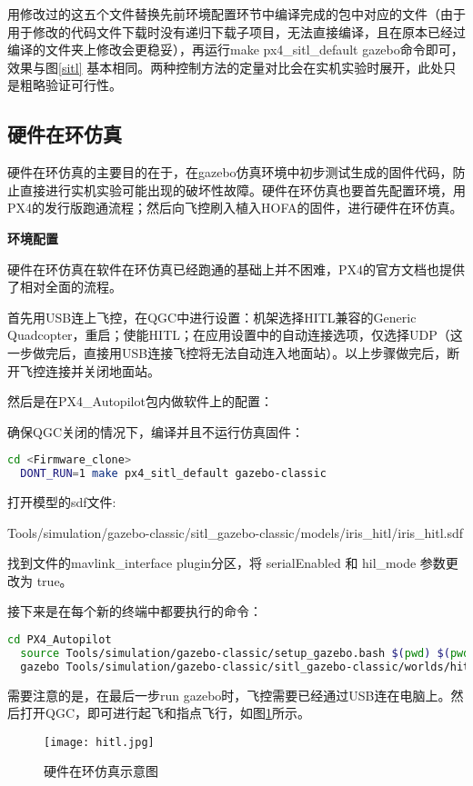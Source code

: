 用修改过的这五个文件替换先前环境配置环节中编译完成的包中对应的文件（由于用于修改的代码文件下载时没有递归下载子项目，无法直接编译，且在原本已经过编译的文件夹上修改会更稳妥），再运行make px4\_sitl\_default gazebo命令即可，效果与图\ref{sitl} 基本相同。两种控制方法的定量对比会在实机实验时展开，此处只是粗略验证可行性。

\subsection{硬件在环仿真}
硬件在环仿真的主要目的在于，在gazebo仿真环境中初步测试生成的固件代码，防止直接进行实机实验可能出现的破坏性故障。硬件在环仿真也要首先配置环境，用PX4的发行版跑通流程；然后向飞控刷入植入HOFA的固件，进行硬件在环仿真。

\textbf{环境配置}

硬件在环仿真在软件在环仿真已经跑通的基础上并不困难，PX4的官方文档也提供了相对全面的流程\cite{px4hitl}。

首先用USB连上飞控，在QGC中进行设置：机架选择HITL兼容的Generic Quadcopter，重启；使能HITL；在应用设置中的自动连接选项，仅选择UDP（这一步做完后，直接用USB连接飞控将无法自动连入地面站）。以上步骤做完后，断开飞控连接并关闭地面站。

然后是在PX4\_Autopilot包内做软件上的配置\cite{px4hitl}：

确保QGC关闭的情况下，编译并且不运行仿真固件：
\begin{lstlisting}[language=Bash, basicstyle=\footnotesize, linewidth=\linewidth, breaklines=true]
  cd <Firmware_clone>
  DONT_RUN=1 make px4_sitl_default gazebo-classic
\end{lstlisting}

打开模型的sdf文件:

Tools/simulation/gazebo-classic/sitl\_gazebo-classic/models/iris\_hitl/iris\_hitl.sdf

找到文件的mavlink\_interface plugin分区，将 serialEnabled 和 hil\_mode 参数更改为 true。

接下来是在每个新的终端中都要执行的命令：

\begin{lstlisting}[language=Bash, basicstyle=\footnotesize, linewidth=\linewidth, breaklines=true]
  cd PX4_Autopilot
  source Tools/simulation/gazebo-classic/setup_gazebo.bash $(pwd) $(pwd)/build/px4_sitl_default
  gazebo Tools/simulation/gazebo-classic/sitl_gazebo-classic/worlds/hitl_iris.world
\end{lstlisting}


需要注意的是，在最后一步run gazebo时，飞控需要已经通过USB连在电脑上。然后打开QGC，即可进行起飞和指点飞行，如图\ref{hitl}所示。
\begin{figure}[!h]
  \centering
  \texttt{[image: hitl.jpg]}
  \caption{硬件在环仿真示意图}
  \label{hitl}
\end{figure}

